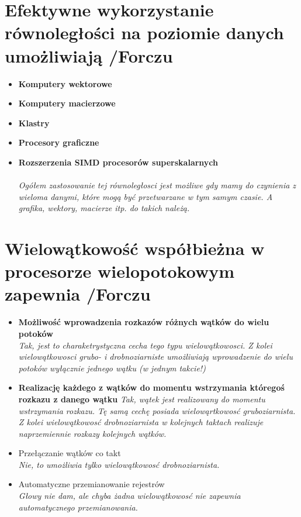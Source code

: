 \documentclass[a4paper,twoside]{article}
\begin{document}
\section{Efektywne wykorzystanie równoległości na poziomie danych umożliwiają {\small /Forczu}}
	\begin{itemize}
    \item \textbf{Komputery wektorowe}
    \item \textbf{Komputery macierzowe}
    \item \textbf{Klastry}
    \item \textbf{Procesory graficzne}
    \item \textbf{Rozszerzenia SIMD procesorów superskalarnych}\\\\
    {\small \emph{Ogółem zastosowanie tej równoległosci jest możliwe gdy mamy do czynienia z wieloma danymi, które mogą być przetwarzane w tym samym czasie. A grafika, wektory, macierze itp. do takich należą.}}
    \end{itemize}

\section{Wielowątkowość współbieżna w procesorze wielopotokowym zapewnia {\small /Forczu}}
	\begin{itemize}
    \item \textbf{Możliwość wprowadzenia rozkazów różnych wątków do wielu potoków}\\
    {\small \emph{Tak, jest to charaketrystyczna cecha tego typu wielowątkowosci. Z kolei wielowątkowosci grubo- i drobnoziarniste umożliwiają wprowadzenie do wielu potoków \emph{wyłącznie} jednego wątku (w jednym takcie!)}}
    \item \textbf{Realizację każdego z wątków do momentu wstrzymania któregoś rozkazu z danego wątku}
    {\small \emph{Tak, wątek jest realizowany do momentu wstrzymania rozkazu. Tę samą cechę posiada wielowąrtkowosć gruboziarnista. Z kolei wielowątkowosć drobnoziarnista w kolejnych taktach realizuje naprzemiennie rozkazy kolejnych wątków.}}
    \item Przełączanie wątków co takt\\
    {\small \emph{Nie, to umożliwia tylko wielowątkowosć drobnoziarnista.}}
    \item Automatyczne przemianowanie rejestrów\\
    {\small \emph{Głowy nie dam, ale chyba żadna wielowątkowosć nie zapewnia automatycznego przemianowania.}}
    \end{itemize}
\end{document}
